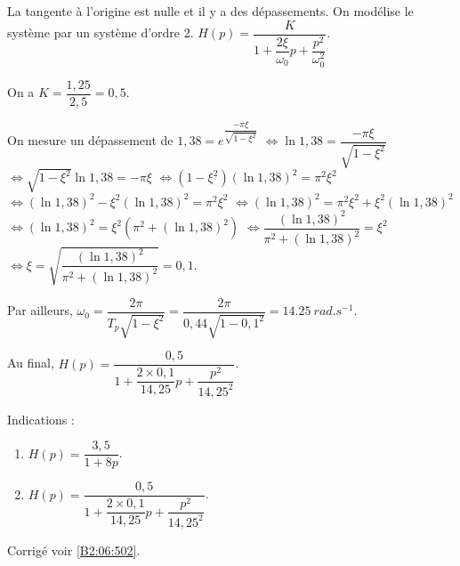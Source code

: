 La tangente à l'origine est nulle et il y a des dépassements. On modélise le système par un système d'ordre 2. 
$H(p)=\dfrac{K}{1+\dfrac{2\xi}{\omega_0}p+\dfrac{p^2}{\omega_0^2}}$.

On a $K= \dfrac{1,25}{2,5}=0,5$.

On mesure un dépassement de 
$1,38 = e^{\dfrac{-\pi \xi}{\sqrt{1-\xi^2}}}$
$\Leftrightarrow \ln 1,38 = \dfrac{-\pi \xi}{\sqrt{1-\xi^2}}$
$\Leftrightarrow \sqrt{1-\xi^2} \ln 1,38 = -\pi \xi$
$\Leftrightarrow (1-\xi^2) (\ln 1,38)^2= \pi^2 \xi^2$
$\Leftrightarrow (\ln 1,38)^2-\xi^2(\ln 1,38)^2 = \pi^2 \xi^2$
$\Leftrightarrow (\ln 1,38)^2 = \pi^2 \xi^2 + \xi^2(\ln 1,38)^2$
$\Leftrightarrow (\ln 1,38)^2 =\xi^2 \left(\pi^2  + (\ln 1,38)^2\right)$
$\Leftrightarrow \dfrac{(\ln 1,38)^2}{\pi^2  + (\ln 1,38)^2} =\xi^2 $
$\Leftrightarrow \xi = \sqrt{\dfrac{(\ln 1,38)^2}{\pi^2  +(\ln 1,38)^2}} =0,1 $.


Par ailleurs, $\omega_0 = \dfrac{2\pi }{T_p \sqrt{1-\xi^2}} =\dfrac{2\pi }{0,44 \sqrt{1-0,1^2}} = \SI{14,25}{rad.s^{-1}}$.

Au final, $H(p)=\dfrac{0,5}{1+\dfrac{2\times 0,1}{14,25}p+\dfrac{p^2}{14,25^2}}$.
\else
\fi


\ifprof
\else
Indications :
\begin{enumerate}
\item  $H(p)=\dfrac{3,5}{1+8p}$.
\item $H(p)=\dfrac{0,5}{1+\dfrac{2\times 0,1}{14,25}p+\dfrac{p^2}{14,25^2}}$.
\end{enumerate}
\begin{flushright}
\footnotesize{Corrigé  voir \ref{B2:06:502}.}
\end{flushright}%
\fi